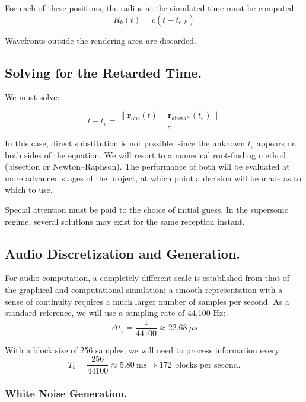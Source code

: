\documentclass[10.5pt]{article}
\begin{document}
	For each of these positions, the radius at the simulated time must be computed:
	\begin{equation*}
		R_k (t) = c(t - t_{e, k})
	\end{equation*}
	
	Wavefronts outside the rendering area are discarded. 
	
	\subsection{Solving for the Retarded Time.}
	
	We must solve:
	
	\begin{equation*}
		t - t_e = \frac{\|\mathbf{r}_{\text{obs}}(t) - \mathbf{r}_{\text{aircraft}}(t_e)\|}{c}
	\end{equation*}
	
	In this case, direct substitution is not possible, since the unknown $t_e$ appears on both sides of the equation. We will resort to a numerical root-finding method (bisection or Newton--Raphson). The performance of both will be evaluated at more advanced stages of the project, at which point a decision will be made as to which to use. 
	
	Special attention must be paid to the choice of initial guess. In the supersonic regime, several solutions may exist for the same reception instant.
	
	\subsection{Audio Discretization and Generation.}
	
	For audio computation, a completely different scale is established from that of the graphical and computational simulation; a smooth representation with a sense of continuity requires a much larger number of samples per second. As a standard reference, we will use a sampling rate of 44,100 Hz:
	\begin{equation*}
		\Delta t_s = \frac{1}{44100} \approx 22.68\ \mu\text{s}
	\end{equation*}
	
	With a block size of 256 samples, we will need to process information every:
	\begin{equation*}
		T_b = \frac{256}{44100} \approx 5.80\ \text{ms} \Rightarrow \text{172 blocks per second.}
	\end{equation*}
	
	\subsubsection{White Noise Generation.}
	
\end{document}
